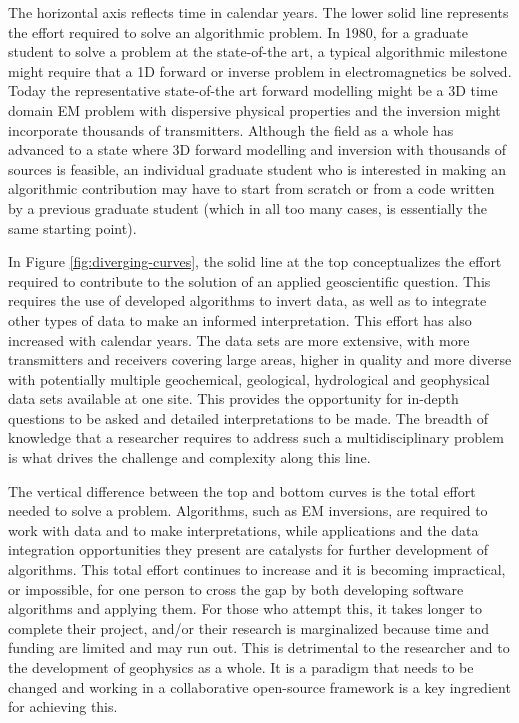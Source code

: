 \documentclass[paper]{geophysics}
\begin{document}
The horizontal axis reflects time in calendar years. The lower solid line represents the effort required to solve an algorithmic problem. In 1980, for a graduate student to solve a problem at the state-of-the art, a typical algorithmic milestone might require that a 1D forward or inverse problem in electromagnetics be solved. Today the representative state-of-the art forward modelling might be a 3D time domain EM problem with dispersive physical properties and the inversion might incorporate thousands of transmitters. Although the field as a whole has advanced to a state where 3D forward modelling and inversion with thousands of sources is feasible, an individual graduate student who is interested in making an algorithmic contribution may have to start from scratch or from a code written by a previous graduate student (which in all too many cases, is essentially the same starting point).

In Figure \ref{fig:diverging-curves}, the solid line at the top conceptualizes the effort required to contribute to the solution of an applied geoscientific question. This requires the use of developed algorithms to invert data, as well as to integrate other types of data to make an informed interpretation. This effort has also increased with calendar years. The data sets are more extensive, with more transmitters and receivers covering large areas, higher in quality and more diverse with potentially multiple geochemical, geological, hydrological and geophysical data sets available at one site. This provides the opportunity for in-depth questions to be asked and detailed interpretations to be made. The breadth of knowledge that a researcher requires to address such a multidisciplinary problem is what drives the challenge and complexity along this line.

The vertical difference between the top and bottom curves is the total effort needed to solve a problem. Algorithms, such as EM inversions, are required to work with data and to make interpretations, while applications and the data integration opportunities they present are catalysts for  further development of algorithms. This total effort continues to increase and it is becoming impractical, or impossible, for one person to cross the gap by both developing software algorithms and applying them. For those who attempt this, it takes longer to complete their project, and/or their research is marginalized because time and funding are limited and may run out. This is detrimental to the researcher and to the development of geophysics as a whole. It is a paradigm that needs to be changed and working in a collaborative open-source framework is a key ingredient for achieving this.
\end{document}
